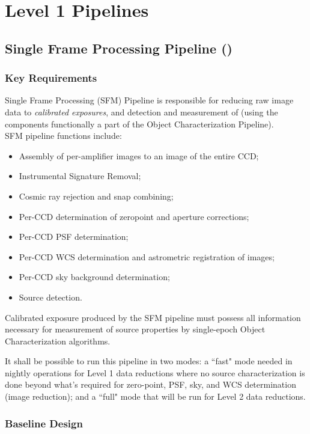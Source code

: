 \section{Level 1 Pipelines}
\label{sec:ap}

\subsection{Single Frame Processing Pipeline (\wbsSFM)}

\subsubsection{Key Requirements}

Single Frame Processing (SFM) Pipeline is responsible for reducing raw image data to \emph{calibrated exposures}, and detection and measurement of \Sources (using the components functionally a part of the Object Characterization Pipeline).
\\

SFM pipeline functions include:
%
\begin{itemize}
    \item Assembly of per-amplifier images to an image of the entire CCD;
    \item Instrumental Signature Removal;
    \item Cosmic ray rejection and snap combining;
    \item Per-CCD determination of zeropoint and aperture corrections;
    \item Per-CCD PSF determination;
    \item Per-CCD WCS determination and astrometric registration of images;
    \item Per-CCD sky background determination;
    \item Source detection.
\end{itemize}

Calibrated exposure produced by the SFM pipeline must possess all information necessary for measurement of source properties by single-epoch Object Characterization algorithms.

It shall be possible to run this pipeline in two modes: a ``fast" mode needed in nightly operations for Level 1 data reductions where no source characterization is done beyond what's required for zero-point, PSF, sky, and WCS determination (image reduction); and a ``full" mode that will be run for Level 2 data reductions.

\subsubsection{Baseline Design}

